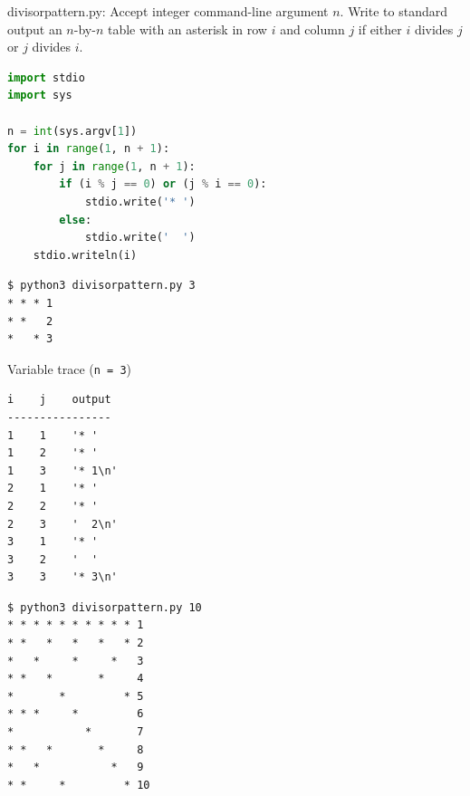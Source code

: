 \documentclass[8pt,a4paper,compress]{beamer}
\begin{document}
\begin{frame}[fragile]
\pause

\begin{framed}
\tiny divisorpattern.py: Accept integer command-line argument $n$. Write to standard output an $n$-by-$n$ table with an asterisk in row $i$ and column $j$ if either $i$ divides $j$ or $j$ divides $i$.
\end{framed}

\begin{lstlisting}[language=Python,style=focusin]
import stdio
import sys

n = int(sys.argv[1])
for i in range(1, n + 1):
    for j in range(1, n + 1):
        if (i % j == 0) or (j % i == 0):
            stdio.write('* ')
        else:
            stdio.write('  ')
    stdio.writeln(i)
\end{lstlisting}

\pause\bigskip

\begin{minipage}{150pt}
\begin{lstlisting}[language={},style=focusin]
$ python3 divisorpattern.py 3
* * * 1
* *   2
*   * 3
\end{lstlisting}
\end{minipage}\hfill
\begin{minipage}{100pt}
Variable trace (\lstinline{n = 3})
\begin{lstlisting}[language={},style=focusin]
i    j    output
----------------
1    1    '* '
1    2    '* '
1    3    '* 1\n'
2    1    '* '
2    2    '* '
2    3    '  2\n'
3    1    '* '
3    2    '  '  
3    3    '* 3\n'
\end{lstlisting}
\end{minipage}
\end{frame}

\begin{frame}[fragile]
\pause

\begin{lstlisting}[language={},style=focusin]
$ python3 divisorpattern.py 10
* * * * * * * * * * 1
* *   *   *   *   * 2
*   *     *     *   3
* *   *       *     4
*       *         * 5
* * *     *         6
*           *       7
* *   *       *     8
*   *           *   9
* *     *         * 10
\end{lstlisting}
\end{frame}
\end{document}
